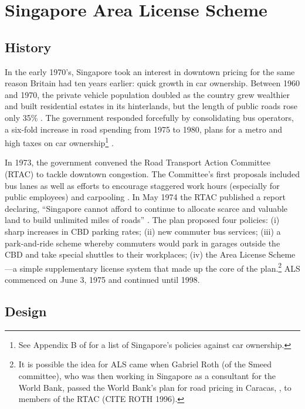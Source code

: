 \section{Singapore Area License Scheme}

\subsection{History}

In the early 1970's, Singapore took an interest in downtown pricing for the same reason Britain had ten years earlier: quick growth in car ownership. Between 1960 and 1970, the private vehicle population doubled as the country grew wealthier and built residential estates in its hinterlands, but the length of public roads rose only 35\% \citep[p.211-212]{Santos2004}. The government responded forcefully by consolidating bus operators, a six-fold increase in road spending from 1975 to 1980, plans for a metro and high taxes on car ownership\footnote{See Appendix B of \citet{Gomez-Ibanez1994} for a list of Singapore's policies against car ownership.} \citep{Santos2004}. 

In 1973, the government convened the Road Transport Action Committee (RTAC) to tackle downtown congestion. The Committee's first proposals included bus lanes as well as efforts to encourage staggered work hours (especially for public employees) and carpooling \citep{Chin1998}. In May 1974 the RTAC published a report declaring, ``Singapore cannot afford to continue to allocate scarce and valuable land to build unlimited miles of roads'' \citep[p.3]{SRTAC1974}. The plan proposed four policies: (i) sharp increases in CBD parking rates; (ii) new commuter bus services; (iii) a park-and-ride scheme whereby commuters would park in garages outside the CBD and take special shuttles to their workplaces; (iv) the Area License Scheme---a simple supplementary license system that made up the core of the plan.\footnote{It is possible the idea for ALS came when Gabriel Roth (of the Smeed committee), who was then working in Singapore as a consultant for the World Bank, passed the World Bank's plan for road pricing in Caracas, \citet{Vorhees1973}, to members of the RTAC (CITE ROTH 1996).} ALS commenced on June 3, 1975 and continued until 1998. 

\subsection{Design}

